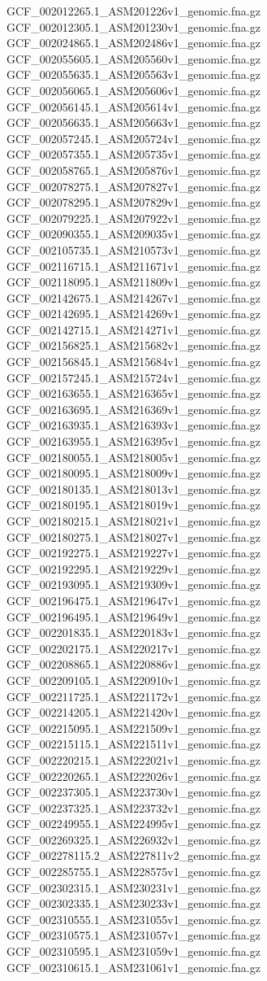 \documentclass[12pt, letterpaper]{article}
\begin{document}
\begin{verbatim*}
GCF_002012265.1_ASM201226v1_genomic.fna.gz
GCF_002012305.1_ASM201230v1_genomic.fna.gz
GCF_002024865.1_ASM202486v1_genomic.fna.gz
GCF_002055605.1_ASM205560v1_genomic.fna.gz
GCF_002055635.1_ASM205563v1_genomic.fna.gz
GCF_002056065.1_ASM205606v1_genomic.fna.gz
GCF_002056145.1_ASM205614v1_genomic.fna.gz
GCF_002056635.1_ASM205663v1_genomic.fna.gz
GCF_002057245.1_ASM205724v1_genomic.fna.gz
GCF_002057355.1_ASM205735v1_genomic.fna.gz
GCF_002058765.1_ASM205876v1_genomic.fna.gz
GCF_002078275.1_ASM207827v1_genomic.fna.gz
GCF_002078295.1_ASM207829v1_genomic.fna.gz
GCF_002079225.1_ASM207922v1_genomic.fna.gz
GCF_002090355.1_ASM209035v1_genomic.fna.gz
GCF_002105735.1_ASM210573v1_genomic.fna.gz
GCF_002116715.1_ASM211671v1_genomic.fna.gz
GCF_002118095.1_ASM211809v1_genomic.fna.gz
GCF_002142675.1_ASM214267v1_genomic.fna.gz
GCF_002142695.1_ASM214269v1_genomic.fna.gz
GCF_002142715.1_ASM214271v1_genomic.fna.gz
GCF_002156825.1_ASM215682v1_genomic.fna.gz
GCF_002156845.1_ASM215684v1_genomic.fna.gz
GCF_002157245.1_ASM215724v1_genomic.fna.gz
GCF_002163655.1_ASM216365v1_genomic.fna.gz
GCF_002163695.1_ASM216369v1_genomic.fna.gz
GCF_002163935.1_ASM216393v1_genomic.fna.gz
GCF_002163955.1_ASM216395v1_genomic.fna.gz
GCF_002180055.1_ASM218005v1_genomic.fna.gz
GCF_002180095.1_ASM218009v1_genomic.fna.gz
GCF_002180135.1_ASM218013v1_genomic.fna.gz
GCF_002180195.1_ASM218019v1_genomic.fna.gz
GCF_002180215.1_ASM218021v1_genomic.fna.gz
GCF_002180275.1_ASM218027v1_genomic.fna.gz
GCF_002192275.1_ASM219227v1_genomic.fna.gz
GCF_002192295.1_ASM219229v1_genomic.fna.gz
GCF_002193095.1_ASM219309v1_genomic.fna.gz
GCF_002196475.1_ASM219647v1_genomic.fna.gz
GCF_002196495.1_ASM219649v1_genomic.fna.gz
GCF_002201835.1_ASM220183v1_genomic.fna.gz
GCF_002202175.1_ASM220217v1_genomic.fna.gz
GCF_002208865.1_ASM220886v1_genomic.fna.gz
GCF_002209105.1_ASM220910v1_genomic.fna.gz
GCF_002211725.1_ASM221172v1_genomic.fna.gz
GCF_002214205.1_ASM221420v1_genomic.fna.gz
GCF_002215095.1_ASM221509v1_genomic.fna.gz
GCF_002215115.1_ASM221511v1_genomic.fna.gz
GCF_002220215.1_ASM222021v1_genomic.fna.gz
GCF_002220265.1_ASM222026v1_genomic.fna.gz
GCF_002237305.1_ASM223730v1_genomic.fna.gz
GCF_002237325.1_ASM223732v1_genomic.fna.gz
GCF_002249955.1_ASM224995v1_genomic.fna.gz
GCF_002269325.1_ASM226932v1_genomic.fna.gz
GCF_002278115.2_ASM227811v2_genomic.fna.gz
GCF_002285755.1_ASM228575v1_genomic.fna.gz
GCF_002302315.1_ASM230231v1_genomic.fna.gz
GCF_002302335.1_ASM230233v1_genomic.fna.gz
GCF_002310555.1_ASM231055v1_genomic.fna.gz
GCF_002310575.1_ASM231057v1_genomic.fna.gz
GCF_002310595.1_ASM231059v1_genomic.fna.gz
GCF_002310615.1_ASM231061v1_genomic.fna.gz

\end{verbatim*}
\end{document}
